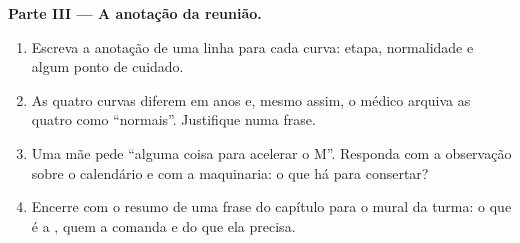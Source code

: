 \begin{problem}
\medskip\noindent\textbf{Parte III --- A anotação da
reunião.}
\begin{enumerate}[resume]
  \item Escreva a anotação de uma linha para cada curva: etapa,
        normalidade e algum ponto de cuidado.
  \item As quatro curvas diferem em anos e, mesmo assim, o médico
        arquiva as quatro como ``normais''. Justifique numa frase.
  \item Uma mãe pede ``alguma coisa para acelerar o M''. Responda com
        a observação sobre o calendário e com a maquinaria: o que há
        para consertar?
  \item Encerre com o resumo de uma frase do capítulo para o mural da
        turma: o que é a , quem a comanda e do que ela
        precisa.
\end{enumerate}
\end{problem}
